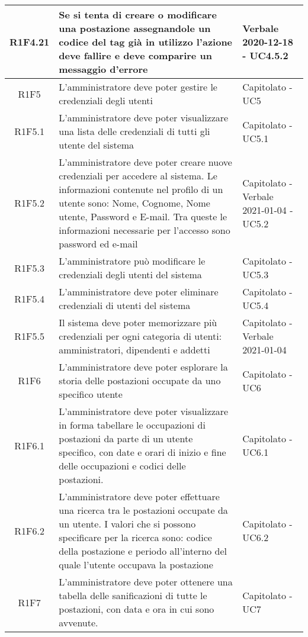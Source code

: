 \begin{center}
\begin{longtable}{|c|p{10cm}|p{4cm}|}
			R1F4.21&Se si tenta di creare o modificare una postazione assegnandole un codice del tag già in utilizzo l'azione deve fallire e deve comparire un messaggio d'errore	&Verbale 2020-12-18 - UC4.5.2 	\\
					\hline
			R1F5&L'amministratore deve poter gestire le credenziali degli utenti	& Capitolato - UC5		\\
					\hline
R1F5.1&L'amministratore deve poter visualizzare una lista delle credenziali di tutti gli utente del sistema	& Capitolato - UC5.1	\\
					\hline
R1F5.2&L'amministratore deve poter creare nuove credenziali per accedere al sistema. Le informazioni contenute nel profilo di un utente sono: Nome, Cognome, Nome utente, Password e E-mail. Tra queste le informazioni necessarie per l'accesso sono password ed e-mail	& Capitolato - Verbale 2021-01-04 - UC5.2	\\
						\hline
			R1F5.3&L'amministratore può modificare le credenziali degli utenti del sistema	&Capitolato - UC5.3 	\\
					\hline
			R1F5.4&L'amministratore deve poter eliminare credenziali di utenti del sistema	& Capitolato - UC5.4	\\
					\hline
R1F5.5&Il sistema deve poter memorizzare più credenziali per ogni categoria di utenti: amministratori, dipendenti e addetti	& Capitolato - Verbale 2021-01-04	\\
					\hline
R1F6&L'amministratore deve poter esplorare la storia delle postazioni occupate da uno specifico utente	& Capitolato - UC6	\\
						\hline
			R1F6.1&L'amministratore deve poter visualizzare in forma tabellare le occupazioni di postazioni da parte di un utente specifico, con date e orari di inizio e fine delle occupazioni e codici delle postazioni.	&Capitolato - UC6.1 	\\
					\hline
			R1F6.2&L'amministratore deve poter effettuare una ricerca tra le postazioni occupate da un utente. I valori che si possono specificare per la ricerca sono: codice della postazione e periodo all'interno del quale l'utente occupava la postazione	& 	Capitolato - UC6.2\\
					\hline
R1F7&L'amministratore deve poter ottenere una tabella delle sanificazioni di tutte le postazioni, con data e ora in cui sono avvenute.	&Capitolato - UC7 	\\
					

\end{longtable}
\end{center}
